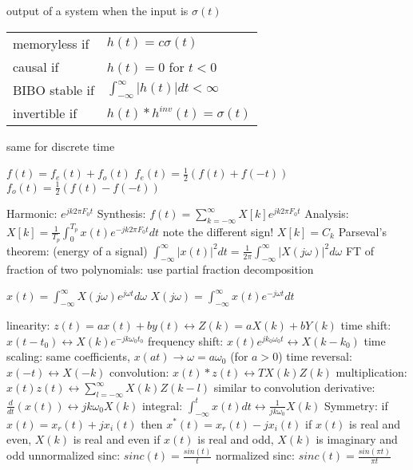 \documentclass[12pt]{article}
\begin{document}
\begin{multicols*}{2}
\begin{flushleft}
\begin{outline}[longenum]
  \1 output of a system when the input is $\sigma(t)$
  \1 \begin{tabular}{l l}
    memoryless if  & $h(t) = c\sigma(t)$                          \\
    causal if      & $h(t)=0$ for $t<0$                           \\
    BIBO stable if & $\int_{-\infty}^{\infty} |h(t)| dt < \infty$ \\
    invertible if  & $h(t)*h^{inv}(t)=\sigma(t)$                  \\
  \end{tabular}
    \2 same for discrete time


  \1 $f(t) = f_e(t) + f_o(t)$
  \1 $f_e(t) = \frac{1}{2} ( f(t) + f(-t) )$
  \1 $f_o(t) = \frac{1}{2} ( f(t) - f(-t) )$

  \1 Harmonic: $e^{jk2\pi F_0 t}$
  \1 Synthesis: $f(t) = \sum_{k=-\infty}^{\infty} X[k] e^{jk2\pi F_0 t}$
  \1 Analysis: $X[k] = \frac{1}{T_p}\int_{0}^{T_p} x(t) e^{-jk2\pi F_0 t} dt$
    \2 note the different sign!
  \1 $X[k] = C_k$
  \1 Parseval's theorem: (energy of a signal)
    $\int_{-\infty}^{\infty} |x(t)|^2 dt = \frac{1}{2\pi} \int_{-\infty}^{\infty} |X(j\omega)|^2 d\omega$
  \1 FT of fraction of two polynomials: use partial fraction decomposition

  \1 $x(t) =       \int_{-\infty}^{\infty} X(j\omega) e^{ j \omega t} d\omega$
  \1 $X(j\omega) = \int_{-\infty}^{\infty} x(t)       e^{-j \omega t} dt     $

  \1 linearity: $z(t) = ax(t)+by(t) \leftrightarrow Z(k) = aX(k)+bY(k) $
  \1 time shift: $x(t-t_0) \leftrightarrow X(k)e^{-jk\omega_0t_0}$
  \1 frequency shift: $x(t)e^{jk_0\omega_0t} \leftrightarrow X(k-k_0)$
  \1 time scaling: same coefficients, $x(at) \rightarrow \omega = a\omega_0$ (for $a>0$)
  \1 time reversal: $x(-t) \leftrightarrow X(-k)$
  \1 convolution: $x(t)\ast z(t) \leftrightarrow TX(k)Z(k) $
  \1 multiplication: $x(t)z(t) \leftrightarrow \sum_{l=-\infty}^{\infty} X(k)Z(k-l)$
    \2 similar to convolution
  \1 derivative: $\frac{d}{dt}(x(t)) \leftrightarrow jk\omega_0 X(k) $
  \1 integral: $\int_{-\infty}^{t} x(t) dt \leftrightarrow \frac{1}{jk\omega_0} X(k) $
  \1 Symmetry: if $x(t)=x_r(t)+jx_i(t)$ then $x^*(t)=x_r(t)-jx_i(t)$
  \1 if $x(t)$ is real and even, $X(k)$ is real and even
  \1 if $x(t)$ is real and odd, $X(k)$ is imaginary and odd
  \1 unnormalized sinc: $sinc(t) = \frac{sin(t)}{t}$
  \1 normalized sinc: $sinc(t) = \frac{sin(\pi t)}{\pi t}$


\end{outline}
\end{flushleft}
\end{multicols*}
\end{document}
